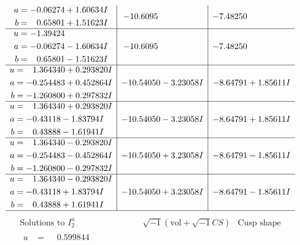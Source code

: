 \documentclass[1p]{elsarticle_modified}
\theoremstyle{definition}
\newcommand{\I}{\sqrt{-1}}
\begin{document}
$$\begin{array}{c|c|c}
\begin{aligned}
a &= -0.06274 + 1.60634 I \\
b &= \phantom{-}0.65801 + 1.51623 I\end{aligned}
 & -10.6095\phantom{ +0.000000I} & -7.48250\phantom{ +0.000000I} \\ \hline\begin{aligned}
u &= -1.39424\phantom{ +0.000000I} \\
a &= -0.06274 - 1.60634 I \\
b &= \phantom{-}0.65801 - 1.51623 I\end{aligned}
 & -10.6095\phantom{ +0.000000I} & -7.48250\phantom{ +0.000000I} \\ \hline\begin{aligned}
u &= \phantom{-}1.364340 + 0.293820 I \\
a &= -0.254483 + 0.452864 I \\
b &= -1.260800 + 0.297832 I\end{aligned}
 & -10.54050 - 3.23058 I & -8.64791 + 1.85611 I \\ \hline\begin{aligned}
u &= \phantom{-}1.364340 + 0.293820 I \\
a &= -0.43118 - 1.83794 I \\
b &= \phantom{-}0.43888 - 1.61941 I\end{aligned}
 & -10.54050 - 3.23058 I & -8.64791 + 1.85611 I \\ \hline\begin{aligned}
u &= \phantom{-}1.364340 - 0.293820 I \\
a &= -0.254483 - 0.452864 I \\
b &= -1.260800 - 0.297832 I\end{aligned}
 & -10.54050 + 3.23058 I & -8.64791 - 1.85611 I \\ \hline\begin{aligned}
u &= \phantom{-}1.364340 - 0.293820 I \\
a &= -0.43118 + 1.83794 I \\
b &= \phantom{-}0.43888 + 1.61941 I\end{aligned}
 & -10.54050 + 3.23058 I & -8.64791 - 1.85611 I\\
 \hline 
 \end{array}$$\newpage$$\begin{array}{c|c|c}  
\text{Solutions to }I^u_{2}& \I (\text{vol} + \sqrt{-1}CS) & \text{Cusp shape}\\
 \hline 
\begin{aligned}
u &= \phantom{-}0.599844\phantom{ +0.000000I} \\

\end{aligned}
\end{array}$$
\end{document}
